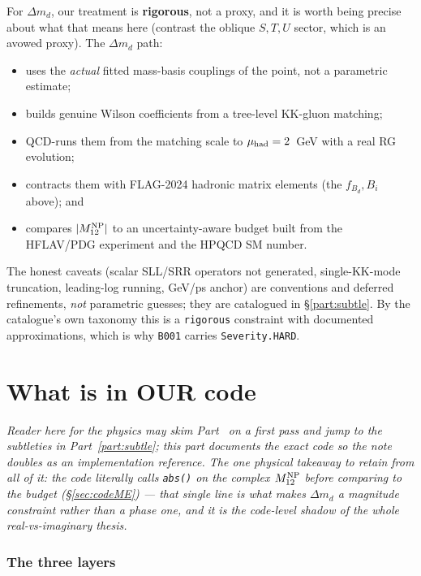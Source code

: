 \documentclass[11pt]{article}
\newcommand{\Mtwelve}{M_{12}}
\newcommand{\dmd}{\Delta m_d}
\newcommand{\code}[1]{\texttt{#1}}
\theoremstyle{definition}
\begin{document}
For $\dmd$, our treatment is \textbf{rigorous}, not a proxy, and it is worth
being precise about what that means here (contrast the oblique $S,T,U$ sector,
which is an avowed proxy). The $\dmd$ path:
\begin{itemize}[leftmargin=1.4em]
\item uses the \emph{actual} fitted mass-basis couplings of the point, not a
parametric estimate;
\item builds genuine Wilson coefficients from a tree-level KK-gluon matching;
\item QCD-runs them from the matching scale to $\mu_{\rm had}=2$~GeV with a real
RG evolution;
\item contracts them with FLAG-2024 hadronic matrix elements (the
$f_{B_d},B_i$ above); and
\item compares $|\Mtwelve^{\rm NP}|$ to an uncertainty-aware budget built from the
HFLAV/PDG experiment and the HPQCD SM number.
\end{itemize}
The honest caveats (scalar SLL/SRR operators not generated, single-KK-mode
truncation, leading-log running, GeV/ps anchor) are conventions and deferred
refinements, \emph{not} parametric guesses; they are catalogued in
\S\ref{part:subtle}. By the catalogue's own taxonomy this is a \code{rigorous}
constraint with documented approximations, which is why \code{B001} carries
\code{Severity.HARD}.

\part{What is in OUR code}
\label{part:code}

\emph{Reader here for the physics may skim Part~\ref{part:code} on a first pass
and jump to the subtleties in Part~\ref{part:subtle}; this part documents the
exact code so the note doubles as an implementation reference. The one physical
takeaway to retain from all of it: the code literally calls \code{abs()} on the
complex $\Mtwelve^{\rm NP}$ before comparing to the budget (\S\ref{sec:codeME}) ---
that single line is what makes $\dmd$ a magnitude constraint rather than a phase
one, and it is the code-level shadow of the whole real-vs-imaginary thesis.}

\section{The three layers}
\label{sec:layers}
\end{document}
